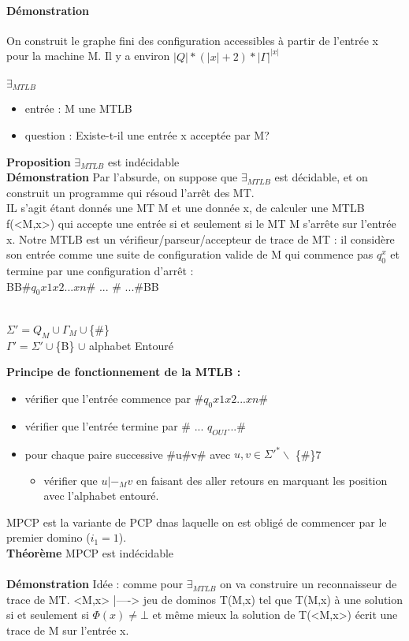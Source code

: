 \documentclass{article}
\begin{document}
{{\paragraph{Démonstration} On construit le graphe fini des configuration accessibles à partir de l'entrée x pour la machine M. Il y a environ $|Q|*(|x|+2)*|\Gamma|^{|x|}$\\\\\textbf{$\exists_{MTLB}$}
\begin{itemize}
\item entrée : M une MTLB
\item question : Existe-t-il une entrée x acceptée par M?\\
\end{itemize}
\textbf{Proposition} $\exists_{MTLB}$ est indécidable\\
\textbf{Démonstration} Par l'absurde, on suppose que $\exists_{MTLB}$ est décidable, et on construit un programme qui résoud l’arrêt des MT.\\IL s'agit étant donnés une MT M et une donnée x, de calculer une MTLB f(<M,x>) qui accepte une entrée si et seulement si le MT M  s’arrête sur l'entrée x. Notre MTLB est un vérifieur/parseur/accepteur de trace de MT : il considère son entrée comme une suite de configuration valide de M qui commence pas  $q_{0}^{x}$ et termine par une configuration d'arrêt : \\
BB\#$q_{0}x1x2...xn$\# ... \# ...\#BB \\\\
\begin{center}
$\Sigma ' = Q_{M} \cup \Gamma_{M} \cup$\{\#\}\\
$\Gamma ' = \Sigma ' \cup $\{B\} $\cup$ alphabet Entouré
\end{center}
\textbf{Principe de fonctionnement de la MTLB : }
\begin{itemize}
\item vérifier que l'entrée commence par \#$q_{0}x1x2...xn$\#
\item vérifier que l'entrée termine par \# ... $q_{OUI}$...\#
\item pour chaque paire successive \#u\#v\# avec $ u,v \in \Sigma'^{*}\backslash$ \{\#\}7
\begin{itemize}
\item vérifier que $u|-_{M}v$ en faisant des aller retours en marquant les position avec l'alphabet entouré.
\end{itemize}
\end{itemize}
MPCP est la variante de PCP dnas laquelle on est obligé de commencer par le premier domino ($i_{1} = 1$).\\\textbf{Théorème} MPCP est indécidable\\\\\textbf{Démonstration} Idée : comme pour $\exists_{MTLB}$ on va construire un reconnaisseur de trace de MT. <M,x> |----> jeu de dominos T(M,x) tel que T(M,x) à une solution si et seulement si $\Phi(x)\neq\bot$ et même mieux la solution de T(<M,x>) écrit une trace de M sur l'entrée x.
}}
\end{document}
